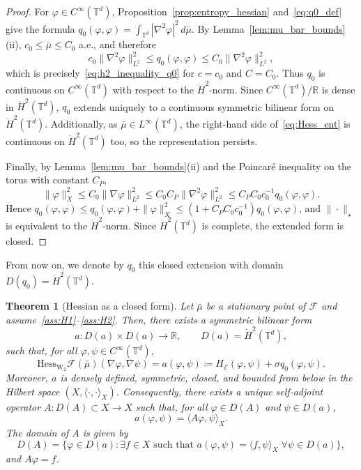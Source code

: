 \documentclass[11pt]{article}
\numberwithin{equation}{section}
\newtheorem{theorem}{Theorem}[section]
\theoremstyle{definition}
\newcommand{\R}{\mathbb{R}}
\newcommand{\T}{\mathbb{T}}
\newcommand{\F}{\mathcal{F}}
\newcommand{\E}{\mathcal{E}}
\newcommand{\Wtwo}{\operatorname{W}_2}
\newcommand{\dotHk}[1][k]{\dot{H}^{#1}}
\begin{document}
\begin{proof}
    For $\varphi \in C^\infty(\T^d)$, Proposition~\ref{prop:entropy_hessian} and~\eqref{eq:q0_def} give the formula $q_0(\varphi,\varphi) = \int_{\T^d}|\nabla^2\varphi|^2\,d\bar\mu$.
    By Lemma~\ref{lem:mu_bar_bounds}(ii), $c_0 \le \bar\mu \le C_0$ a.e., and therefore
    \[
    c_0\|\nabla^2\varphi\|_{L^2}^2 \le q_0(\varphi,\varphi) \le C_0\|\nabla^2\varphi\|_{L^2}^2,
    \]
    which is precisely~\eqref{eq:h2_inequality_q0} for $c = c_0$ and $C = C_0$.
    Thus $q_0$ is continuous on $C^\infty(\T^d)$ with respect to the $\dotHk[2]$-norm.
    Since $C^\infty(\T^d)/\R$ is dense in $\dotHk[2](\T^d)$, $q_0$ extends uniquely to a continuous symmetric bilinear form on $\dotHk[2](\T^d)$.
    Additionally, as $\bar\mu \in L^\infty(\T^d)$, the right-hand side of~\eqref{eq:Hess_ent} is continuous on $\dotHk[2](\T^d)$ too, so the representation persists.

    Finally, by Lemma~\ref{lem:mu_bar_bounds}(ii) and the Poincaré inequality on the torus with constant $C_P$,
    \[
    \|\varphi\|_X^2 \le C_0\|\nabla\varphi\|_{L^2}^2 \le C_0 C_P \|\nabla^2\varphi\|_{L^2}^2 \le C_P C_0 c_0^{-1} q_0(\varphi,\varphi).
    \]
    Hence $q_0(\varphi,\varphi) \le q_0(\varphi,\varphi) + \|\varphi\|_X^2 \le (1 + C_P C_0 c_0^{-1}) q_0(\varphi,\varphi)$, and $\|\cdot\|_\star$ is equivalent to the $\dotHk[2]$-norm. 
    Since $\dotHk[2](\T^d)$ is complete, the extended form is closed.
\end{proof}

From now on, we denote by $q_0$ this closed extension with domain $D(q_0) = \dotHk[2](\T^d)$.

\begin{theorem}[Hessian as a closed form]
    \label{thm:hessian_form}
    Let $\bar\mu$ be a stationary point of $\F$ and assume~\ref{ass:H1}--\ref{ass:H2}. 
    Then, there exists a symmetric bilinear form
    \[
    a: D(a) \times D(a) \to \R, \qquad D(a) = \dotHk[2](\T^d),
    \]
    such that, for all $\varphi, \psi \in C^\infty(\T^d)$,
    \begin{equation}
        \label{eq:HessianF_formula}
        \mathrm{Hess}_{\Wtwo} \F(\bar\mu)(\nabla \varphi, \nabla \psi) = a(\varphi,\psi) \coloneqq H_\E(\varphi,\psi) + \sigma q_0(\varphi, \psi).
    \end{equation}
    Moreover, $a$ is densely defined, symmetric, closed, and bounded from below in the Hilbert space $(X, \langle\cdot,\cdot\rangle_X)$.
    Consequently, there exists a unique self-adjoint operator $A : D(A)\subset X \to X$ such that, for all $\varphi \in D(A)$ and $\psi \in D(a)$,
    \begin{equation}
        \label{eq:A_representation}
        a(\varphi, \psi) = \langle A\varphi, \psi\rangle_X.
    \end{equation}
    The domain of $A$ is given by
    \[
    D(A) = \big\{\varphi \in D(a) : \exists f \in X \text{ such that } a(\varphi,\psi) = \langle f,\psi\rangle_X \; \forall \psi \in D(a)\big\},
    \]
    and $A\varphi = f$.
\end{theorem}
\end{document}
